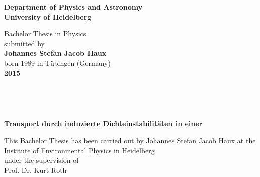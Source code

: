 \begin{titlepage}
\begin{center}
 
\Large\textbf{Department of Physics and Astronomy\\
University of Heidelberg}

\vspace{16cm}

\normalsize
Bachelor Thesis in Physics\\
submitted by \\
\vspace{0.5cm}
\Large\textbf{Johannes Stefan Jacob Haux}\\
\normalsize
\vspace{0.5cm}
born 1989 in Tübingen (Germany)\\
\vspace{0.5cm}
\Large\textbf{2015}
\normalsize

\clearpage
\thispagestyle{empty}

\newpage
\mbox{\,}
\newpage
{}%
\clearpage
\thispagestyle{empty}

\mbox{\,}

\vspace{2.5cm}

\Huge
\onehalfspacing

\textbf{Transport durch \COTm induzierte Dichteinstabilitäten in einer \HSC}

\normalsize
\singlespacing

\vspace{3cm}

% 


\vspace{7.5cm}

\normalsize
This Bachelor Thesis has been carried out by Johannes Stefan Jacob Haux at the\\
Institute of Environmental Physics in Heidelberg\\
under the supervision of\\
Prof. Dr. Kurt Roth

\vfill
\end{center}
\newpage
\mbox{\,}
\newpage
\end{titlepage}

\clearpage
{}